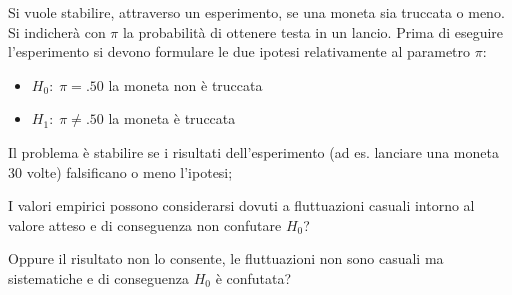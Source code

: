 \documentclass[
  ignorenonframetext,
  compress, aspectratio=149]{beamer}
\providecommand{\tightlist}{%
  \setlength{\itemsep}{0pt}\setlength{\parskip}{0pt}}
\begin{document}
\begin{frame}{}
\label{section-17}
\begin{tcolorbox}[enhanced jigsaw, opacityback=0, arc=.35mm, opacitybacktitle=0.6, rightrule=.15mm, breakable, titlerule=0mm, leftrule=.75mm, title={Esempio}, toprule=.15mm, toptitle=1mm, coltitle=black, bottomrule=.15mm, bottomtitle=1mm, left=2mm, colframe=quarto-callout-note-color-frame, colback=white, colbacktitle=quarto-callout-note-color!10!white]

Si vuole stabilire, attraverso un esperimento, se una moneta sia
truccata o meno. Si indicherà con \(\pi\) la probabilità di ottenere
testa in un lancio. Prima di eseguire l'esperimento si devono formulare
le due ipotesi relativamente al parametro \(\pi\):

\vspace{3mm}

\begin{itemize}
\tightlist
\item
  \(H_0: \; \pi = .50\) la moneta non è truccata
\end{itemize}

\vspace{3mm}

\begin{itemize}
\tightlist
\item
  \(H_1: \; \pi \neq .50\) la moneta è truccata
\end{itemize}

\end{tcolorbox}
\end{frame}

\begin{frame}{}
\label{section-18}
Il problema è stabilire se i risultati dell'esperimento (ad es. lanciare
una moneta 30 volte) falsificano o meno l'ipotesi;

\vspace{3mm}

I valori empirici possono considerarsi dovuti a fluttuazioni casuali
intorno al valore atteso e di conseguenza non confutare \(H_0\)?

\vspace{3mm}

Oppure il risultato non lo consente, le fluttuazioni non sono casuali ma
sistematiche e di conseguenza \(H_0\) è confutata?
\end{frame}
\end{document}
